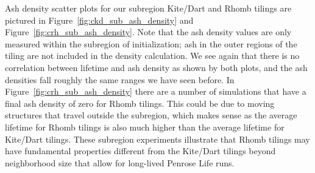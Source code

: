 \documentclass[a4paper,11pt,twoside]{report}
\begin{document}
Ash density scatter plots for our subregion Kite/Dart and Rhomb tilings are pictured in Figure~\ref{fig:ckd_sub_ash_density} and Figure~\ref{fig:crh_sub_ash_density}. Note that the ash density values are only measured within the subregion of initialization; ash in the outer regions of the tiling are not included in the density calculation. We see again that there is no correlation between lifetime and ash density as shown by both plots, and the ash densities fall roughly the same ranges we have seen before. In Figure~\ref{fig:crh_sub_ash_density} there are a number of simulations that have a final ash density of zero for Rhomb tilings. This could be due to moving structures that travel outside the subregion, which makes sense as the average lifetime for Rhomb tilings is also much higher than the average lifetime for Kite/Dart tilings. These subregion experiments illustrate that Rhomb tilings may have fundamental properties  different from the Kite/Dart tilings beyond neighborhood size that allow for long-lived Penrose Life runs. 
\end{document}
